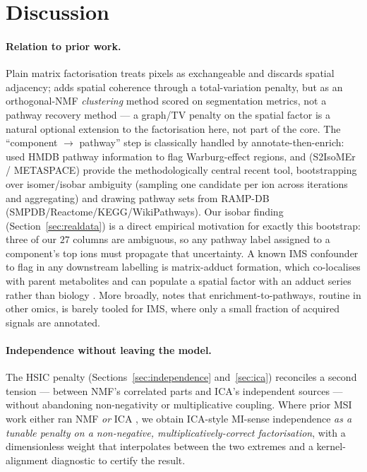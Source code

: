\documentclass[11pt]{article}
\begin{document}
\section{Discussion}
\label{sec:discussion}

\paragraph{Relation to prior work.} Plain matrix factorisation treats pixels as exchangeable
and discards spatial adjacency; \citet{fernsel2021} adds spatial coherence through a
total-variation penalty, but as an orthogonal-NMF \emph{clustering} method scored on
segmentation metrics, not a pathway recovery method --- a graph/TV penalty on the spatial
factor is a natural optional extension to the factorisation here, not part of the core. The
``component $\to$ pathway'' step is classically handled by annotate-then-enrich:
\citet{jones2014} used HMDB pathway information to flag Warburg-effect regions, and
\citet{wittmann2025} (S2IsoMEr / METASPACE) provide the methodologically central recent
tool, bootstrapping over isomer/isobar ambiguity (sampling one candidate per ion across
iterations and aggregating) and drawing pathway sets from RAMP-DB
(SMPDB/Reactome/KEGG/WikiPathways). Our isobar finding (Section~\ref{sec:realdata}) is a
direct empirical motivation for exactly this bootstrap: three of our $27$ columns are
ambiguous, so any pathway label assigned to a component's top ions must propagate that
uncertainty. A known IMS confounder to flag in any downstream labelling is matrix-adduct
formation, which co-localises with parent metabolites and can populate a spatial factor with
an adduct series rather than biology \citep{janda2021}. More broadly, \citet{alexandrov2020}
notes that enrichment-to-pathways, routine in other omics, is barely tooled for IMS, where
only a small fraction of acquired signals are annotated.

\paragraph{Independence without leaving the model.} The HSIC penalty
(Sections~\ref{sec:independence} and~\ref{sec:ica}) reconciles a second tension --- between
NMF's correlated parts and ICA's independent sources --- without abandoning non-negativity
or multiplicative coupling. Where prior MSI work either ran NMF \emph{or} ICA
\citep{siy2007}, we obtain ICA-style MI-sense independence \emph{as a tunable penalty on a
non-negative, multiplicatively-correct factorisation}, with a dimensionless weight that
interpolates between the two extremes and a kernel-alignment diagnostic to certify the
result.
\end{document}
